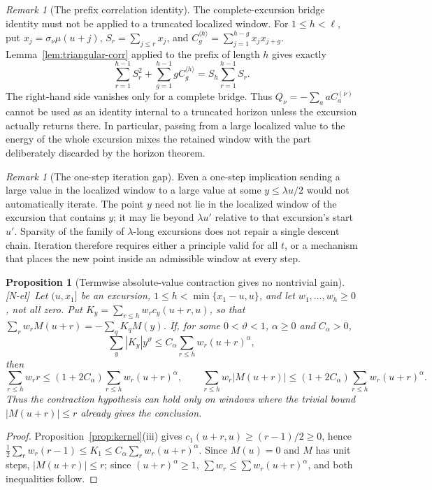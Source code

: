 \documentclass[11pt]{amsart}
\numberwithin{equation}{section}
\theoremstyle{plain}
\newtheorem{proposition}[theorem]{Proposition}
\theoremstyle{definition}
\theoremstyle{remark}
\newtheorem{remark}[theorem]{Remark}
\newcommand{\tagNE}{\textup{[N-el]}}
\begin{document}
\begin{remark}[The prefix correlation identity]
\label{rem:prefix-correlation}
The complete-excursion bridge identity must not be applied to a truncated
localized window.  For $1\le h<\ell$, put
$x_j=\sigma_\nu\mu(u+j)$,
$S_r=\sum_{j\le r}x_j$, and
$C_g^{\langle h\rangle}=\sum_{j=1}^{h-g}x_jx_{j+g}$.  Lemma~\ref{lem:triangular-corr}
applied to the prefix of length $h$ gives exactly
\[
\sum_{r=1}^{h-1}S_r^2+\sum_{g=1}^{h-1}gC_g^{\langle h\rangle}
=S_h\sum_{r=1}^{h-1}S_r.
\]
The right-hand side vanishes only for a complete bridge.  Thus
$Q_\nu=-\sum_a aC_a^{(\nu)}$ cannot be used as an identity internal to a
truncated horizon unless the excursion actually returns there.  In
particular, passing from a large localized value to the energy of the whole
excursion mixes the retained window with the part deliberately discarded by
the horizon theorem.
\end{remark}

\begin{remark}[The one-step iteration gap]
\label{rem:iteration-gap}
Even a one-step implication sending a large value in the localized window
to a large value at some $y\le\lambda u/2$ would not automatically iterate.
The point $y$ need not lie in the localized window of the excursion that
contains $y$; it may lie beyond $\lambda u'$ relative to that excursion's
start $u'$.  Sparsity of the family of $\lambda$-long excursions does not
repair a single descent chain.  Iteration therefore requires either a
principle valid for all $t$, or a mechanism that places the new point inside
an admissible window at every step.
\end{remark}

\begin{proposition}[Termwise absolute-value contraction gives no nontrivial gain]
\label{prop:cone-obstruction}
\tagNE\ Let $(u,x_1]$ be an excursion, $1\le h<\min\{x_1-u,u\}$, and let
$w_1,\dots,w_h\ge0$, not all zero. Put
$K_y=\sum_{r\le h}w_rc_y(u+r,u)$, so that
$\sum_rw_rM(u+r)=-\sum_qK_qM(y)$. If, for some $0<\vartheta<1$, $\alpha\ge0$ and
$C_\alpha>0$,
\[
\sum_y|K_y|y^\vartheta\le C_\alpha\sum_{r\le h}w_r(u+r)^\alpha,
\]
then
\[
\sum_{r\le h}w_rr\le(1+2C_\alpha)\sum_{r\le h}w_r(u+r)^\alpha,
\qquad
\sum_{r\le h}w_r|M(u+r)|
\le(1+2C_\alpha)\sum_{r\le h}w_r(u+r)^\alpha.
\]
Thus the contraction hypothesis can hold only on windows where the trivial
bound $|M(u+r)|\le r$ already gives the conclusion.
\end{proposition}

\begin{proof}
Proposition~\ref{prop:kernel}(iii) gives
$c_1(u+r,u)\ge(r-1)/2\ge0$, hence
$\frac12\sum_rw_r(r-1)\le K_1\le
C_\alpha\sum_rw_r(u+r)^\alpha$. Since $M(u)=0$ and $M$ has unit steps,
$|M(u+r)|\le r$; since $(u+r)^\alpha\ge1$, $\sum w_r\le\sum w_r(u+r)^\alpha$, and both inequalities follow.
\end{proof}
\end{document}
